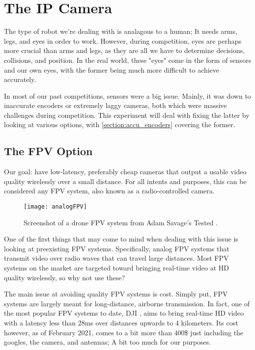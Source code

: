 \section{The IP Camera}
The type of robot we're dealing with is analagous to a human; It needs arms, legs, and eyes in order to work. However, during competition, eyes are perhaps more crucial than arms and legs, as they are all we have to determine decisions, collisions, and position. In the real world, these "eyes" come in the form of sensors and our own eyes, with the former being much more difficult to achieve accurately.

In most of our past competitions, sensors were a big issue. Mainly, it was down to inaccurate encoders or extremely laggy cameras, both which were massive challenges during competition. This experiment will deal with fixing the latter by looking at various options, with \autoref{section:accu_encoders} covering the former.

\subsection{The FPV Option}
Our goal: have low-latency, preferably cheap cameras that output a usable video quality wirelessly over a small distance. For all intents and purposes, this can be considered any FPV system, also known as a radio-controlled camera\cite{FPVWikipedia}.

\begin{figure}[h]
    \centering
    \texttt{[image: analogFPV]}
    \caption{
        Screenshot of a drone FPV system from Adam Savage’s Tested \cite{analogFPV}.
    }
\end{figure}

One of the first things that may come to mind when dealing with this issue is looking at preexisting FPV systems. Specifically, analog FPV systems that transmit video over radio waves that can travel large distances. Most FPV systems on the market are targeted toward bringing real-time video at HD quality wirelessly, so why not use these?

The main issue at avoiding quality FPV systems is cost. Simply put, FPV systems are largely meant for long-distance, airborne transmission. In fact, one of the most popular FPV systems to date, DJI \cite{DJI}, aims to bring real-time HD video with a latency less than 28ms over distances upwards to 4 kilometers. Its cost however, as of February 2021, comes to a bit more than 400\$ just including the googles, the camera, and antennas; A bit too much for our purposes.

